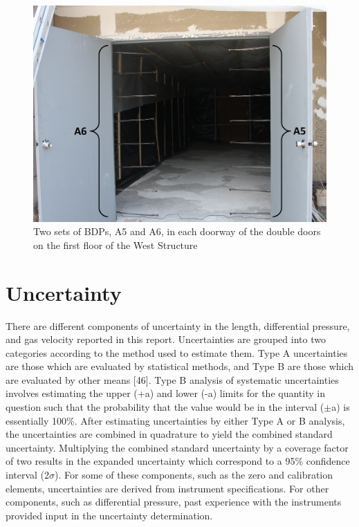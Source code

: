 \documentclass[12pt,oneside]{book}
\begin{document}
\begin{figure}[!ht]
\includegraphics[width=6in]{../../Figures/BDPs}
\caption[Two sets of BDPs in Doorway]{Two sets of BDPs, A5 and A6, in each doorway of the double doors on the first floor of the West Structure}
\label{fig:BDPs}
\end{figure}

\section{Uncertainty}
\label{sec:Uncertainty}
There are different components of uncertainty in the length, differential pressure, and gas velocity reported in this report. Uncertainties are grouped into two categories according to the method used to estimate them. Type A uncertainties are those which are evaluated by statistical methods, and Type B are those which are evaluated by other means [46]. Type B analysis of systematic uncertainties involves estimating the upper (+a) and lower (-a) limits for the quantity in question such that the probability that the value would be in the interval ($\pm$a) is essentially 100\%. After estimating uncertainties by either Type A or B analysis, the uncertainties are combined in quadrature to yield the combined standard uncertainty. Multiplying the combined standard uncertainty by a coverage factor of two results in the expanded uncertainty which correspond to a 95\% confidence interval (2$\sigma$). For some of these components, such as the zero and calibration elements, uncertainties are derived from instrument specifications. For other components, such as differential pressure, past experience with the instruments provided input in the uncertainty determination. 
\end{document}
